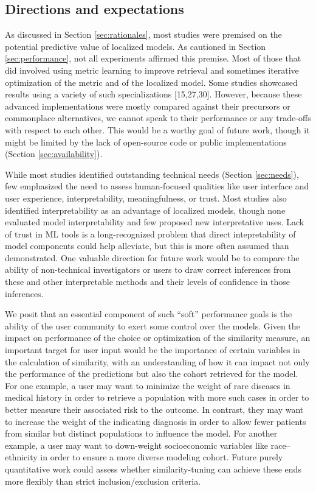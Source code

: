 \documentclass[preprint, 3p,
authoryear]{elsarticle} %
\begin{document}
\hypertarget{directions-and-expectations}{%
\subsection{Directions and
expectations}\label{directions-and-expectations}}

As discussed in Section \ref{sec:rationales}, most studies were premised
on the potential predictive value of localized models. As cautioned in
Section \ref{sec:performance}, not all experiments affirmed this
premise. Most of those that did involved using metric learning to
improve retrieval and sometimes iterative optimization of the metric and
of the localized model. Some studies showcased results using a variety
of such specializations {[}15,27,30{]}. However, because these advanced
implementations were mostly compared against their precursors or
commonplace alternatives, we cannot speak to their performance or any
trade-offs with respect to each other. This would be a worthy goal of
future work, though it might be limited by the lack of open-source code
or public implementations (Section \ref{sec:availability}).

While most studies identified outstanding technical needs (Section
\ref{sec:needs}), few emphasized the need to assess human-focused
qualities like user interface and user experience, interpretability,
meaningfulness, or trust. Most studies also identified interpretability
as an advantage of localized models, though none evaluated model
interpretability and few proposed new interpretative uses. Lack of trust
in ML tools is a long-recognized problem that direct intepretability of
model components could help alleviate, but this is more often assumed
than demonstrated. One valuable direction for future work would be to
compare the ability of non-technical investigators or users to draw
correct inferences from these and other interpretable methods and their
levels of confidence in those inferences.

We posit that an essential component of such ``soft'' performance goals
is the ability of the user community to exert some control over the
models. Given the impact on performance of the choice or optimization of
the similarity measure, an important target for user input would be the
importance of certain variables in the calculation of similarity, with
an understanding of how it can impact not only the performance of the
predictions but also the cohort retrieved for the model. For one
example, a user may want to minimize the weight of rare diseases in
medical history in order to retrieve a population with more such cases
in order to better measure their associated risk to the outcome. In
contrast, they may want to increase the weight of the indicating
diagnosis in order to allow fewer patients from similar but distinct
populations to influence the model. For another example, a user may want
to down-weight socioeconomic variables like race--ethnicity in order to
ensure a more diverse modeling cohort. Future purely quantitative work
could assess whether similarity-tuning can achieve these ends more
flexibly than strict inclusion/exclusion criteria.
\end{document}
